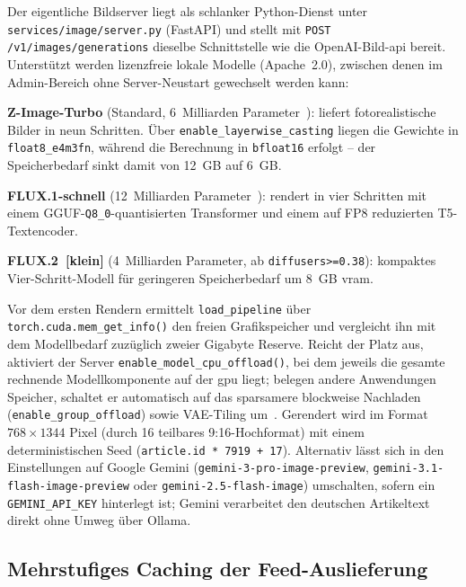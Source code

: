 Der eigentliche Bildserver liegt als schlanker Python-Dienst unter \texttt{services/image/server.py} (FastAPI) und stellt mit \texttt{POST /v1/images/generations} dieselbe Schnittstelle wie die OpenAI-Bild-\gls{api} bereit.
Unterstützt werden lizenzfreie lokale Modelle (Apache~2.0), zwischen denen im Admin-Bereich ohne Server-Neustart gewechselt werden kann:
\begin{compactitem}
    \item \textbf{Z-Image-Turbo} (Standard, 6~Milliarden Parameter~\cite{zimage2025}): liefert fotorealistische Bilder in neun Schritten. Über \texttt{enable\_layerwise\_casting} liegen die Gewichte in \texttt{float8\_e4m3fn}, während die Berechnung in \texttt{bfloat16} erfolgt – der Speicherbedarf sinkt damit von 12~GB auf 6~GB.
    \item \textbf{FLUX.1-schnell} (12~Milliarden Parameter~\cite{flux2024}): rendert in vier Schritten mit einem GGUF-\texttt{Q8\_0}-quantisierten Transformer und einem auf FP8 reduzierten T5-Textencoder.
    \item \textbf{FLUX.2~[klein]} (4~Milliarden Parameter, ab \texttt{diffusers>=0.38}): kompaktes Vier-Schritt-Modell für geringeren Speicherbedarf um 8~GB \gls{vram}.
\end{compactitem}

Vor dem ersten Rendern ermittelt \texttt{load\_pipeline} über \texttt{torch.cuda.mem\_get\_info()} den freien Grafikspeicher und vergleicht ihn mit dem Modellbedarf zuzüglich zweier Gigabyte Reserve.
Reicht der Platz aus, aktiviert der Server \texttt{enable\_model\_cpu\_offload()}, bei dem jeweils die gesamte rechnende Modellkomponente auf der \gls{gpu} liegt; belegen andere Anwendungen Speicher, schaltet er automatisch auf das sparsamere blockweise Nachladen (\texttt{enable\_group\_offload}) sowie VAE-Tiling um~\cite{diffusers}.
Gerendert wird im Format $768 \times 1344$ Pixel (durch 16 teilbares 9:16-Hochformat) mit einem deterministischen Seed (\texttt{article.id * 7919 + 17}).
Alternativ lässt sich in den Einstellungen auf Google Gemini (\texttt{gemini-3-pro-image-preview}, \texttt{gemini-3.1-flash-image-preview} oder \texttt{gemini-2.5-flash-image}) umschalten, sofern ein \texttt{GEMINI\_API\_KEY} hinterlegt ist; Gemini verarbeitet den deutschen Artikeltext direkt ohne Umweg über Ollama.

\subsection{Mehrstufiges Caching der Feed-Auslieferung}

